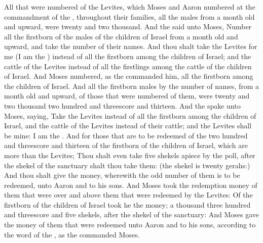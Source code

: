 \begin{biblechapter}
\verse All that were numbered of the Levites, which Moses and Aaron numbered at the commandment of the \LORD, throughout their families, all the males from a month old and upward, were twenty and two thousand.
\verse And the \LORD said unto Moses, Number all the firstborn of the males of the children of Israel from a month old and upward, and take the number of their names.
\verse And thou shalt take the Levites for me (I am the \LORD) instead of all the firstborn among the children of Israel; and the cattle of the Levites instead of all the firstlings among the cattle of the children of Israel.
\verse And Moses numbered, as the \LORD commanded him, all the firstborn among the children of Israel.
\verse And all the firstborn males by the number of names, from a month old and upward, of those that were numbered of them, were twenty and two thousand two hundred and threescore and thirteen.
\verse And the \LORD spake unto Moses, saying,
\verse Take the Levites instead of all the firstborn among the children of Israel, and the cattle of the Levites instead of their cattle; and the Levites shall be mine: I am the \LORD.
\verse And for those that are to be redeemed of the two hundred and threescore and thirteen of the firstborn of the children of Israel, which are more than the Levites;
\verse Thou shalt even take five shekels apiece by the poll, after the shekel of the sanctuary shalt thou take them: (the shekel is twenty gerahs:)
\verse And thou shalt give the money, wherewith the odd number of them is to be redeemed, unto Aaron and to his sons.
\verse And Moses took the redemption money of them that were over and above them that were redeemed by the Levites:
\verse Of the firstborn of the children of Israel took he the money; a thousand three hundred and threescore and five shekels, after the shekel of the sanctuary:
\verse And Moses gave the money of them that were redeemed unto Aaron and to his sons, according to the word of the \LORD, as the \LORD commanded Moses.
\end{biblechapter}

